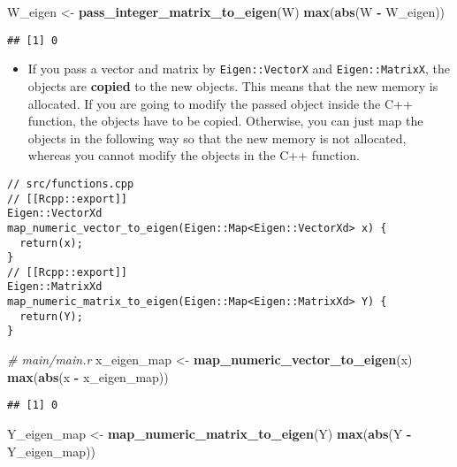 \documentclass[
]{book}
\newenvironment{Shaded}{\begin{snugshade}}{\end{snugshade}}
\newcommand{\CommentTok}[1]{\textcolor[rgb]{0.56,0.35,0.01}{\textit{#1}}}
\newcommand{\KeywordTok}[1]{\textcolor[rgb]{0.13,0.29,0.53}{\textbf{#1}}}
\newcommand{\NormalTok}[1]{#1}
\newcommand{\OperatorTok}[1]{\textcolor[rgb]{0.81,0.36,0.00}{\textbf{#1}}}
\newcommand{\StringTok}[1]{\textcolor[rgb]{0.31,0.60,0.02}{#1}}
\providecommand{\tightlist}{%
  \setlength{\itemsep}{0pt}\setlength{\parskip}{0pt}}
\begin{document}
\begin{Shaded}
\begin{Highlighting}[]
\NormalTok{W_eigen <-}\StringTok{ }\KeywordTok{pass_integer_matrix_to_eigen}\NormalTok{(W)}
\KeywordTok{max}\NormalTok{(}\KeywordTok{abs}\NormalTok{(W }\OperatorTok{-}\StringTok{ }\NormalTok{W_eigen))}
\end{Highlighting}
\end{Shaded}

\begin{verbatim}
## [1] 0
\end{verbatim}

\begin{itemize}
\tightlist
\item
  If you pass a vector and matrix by \texttt{Eigen::VectorX} and \texttt{Eigen::MatrixX}, the objects are \textbf{copied} to the new objects. This means that the new memory is allocated. If you are going to modify the passed object inside the C++ function, the objects have to be copied. Otherwise, you can just map the objects in the following way so that the new memory is not allocated, whereas you cannot modify the objects in the C++ function.
\end{itemize}

\begin{verbatim}
// src/functions.cpp
// [[Rcpp::export]]
Eigen::VectorXd map_numeric_vector_to_eigen(Eigen::Map<Eigen::VectorXd> x) {
  return(x);
}
// [[Rcpp::export]]
Eigen::MatrixXd map_numeric_matrix_to_eigen(Eigen::Map<Eigen::MatrixXd> Y) {
  return(Y);
}
\end{verbatim}

\begin{Shaded}
\begin{Highlighting}[]
\CommentTok{# main/main.r}
\NormalTok{x_eigen_map <-}\StringTok{ }\KeywordTok{map_numeric_vector_to_eigen}\NormalTok{(x)}
\KeywordTok{max}\NormalTok{(}\KeywordTok{abs}\NormalTok{(x }\OperatorTok{-}\StringTok{ }\NormalTok{x_eigen_map))}
\end{Highlighting}
\end{Shaded}

\begin{verbatim}
## [1] 0
\end{verbatim}

\begin{Shaded}
\begin{Highlighting}[]
\NormalTok{Y_eigen_map <-}\StringTok{ }\KeywordTok{map_numeric_matrix_to_eigen}\NormalTok{(Y)}
\KeywordTok{max}\NormalTok{(}\KeywordTok{abs}\NormalTok{(Y }\OperatorTok{-}\StringTok{ }\NormalTok{Y_eigen_map))}
\end{Highlighting}
\end{Shaded}
\end{document}
